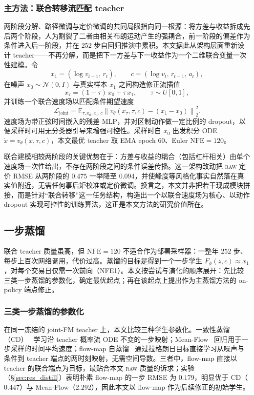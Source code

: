 \documentclass[11pt]{ctexart}
\newcommand{\raw}{\textsc{raw}}
\newcommand{\E}{\mathbb{E}}
\newcommand{\nfe}{\mathrm{NFE}}
\begin{document}
\subsubsection{主方法：联合转移流匹配 teacher}
\label{sec:jointfm}
两阶段分解、路径微调与定价微调的共同局限指向同一根源：将方差与收益拆成先后两个阶段，人为割裂了二者由相关布朗运动产生的强耦合，前一阶段的偏差作为条件进入后一阶段，并在 $252$ 步自回归推演中累积。本文据此从架构层面重新设计 teacher——不再分解，而是把下一方差与下一收益作为一个二维联合变量一次性建模。令
\[
x_1 = (\log v_{t+1},\, r_t), \qquad c=(\log v_t,\,r_{t-1},\,a_t),
\]
在噪声 $x_0\sim\mathcal N(0,I)$ 与真实样本 $x_1$ 之间构造修正流插值~\citep{lipman2023flow,liu2023rectified,albergo2023stochastic}
\[
x_\tau=(1-\tau)\,x_0+\tau\,x_1,\qquad \tau\sim U[0,1],
\]
并训练一个联合速度场以匹配条件期望速度
\begin{equation}
\mathcal L_{\mathrm{joint}}
=\E_{\tau,x_0,x_1,c}
\left\|v_\theta(x_\tau,\tau,c)-(x_1-x_0)\right\|_2^2 .
\end{equation}
速度场为带正弦时间嵌入的残差 MLP，并对区制动作做一定比例的 dropout，以便采样时可用无分类器引导来增强可控性。采样时自 $x_0$ 出发积分 ODE $\dot x=v_\theta(x,\tau,c)$，本文最优 teacher 取 EMA epoch 60、Euler $\nfe{=}120$。

联合建模相较两阶段的关键优势在于：方差与收益的耦合（包括杠杆相关）由单个速度场一次性给出，不存在两阶段之间的条件误差传播。这一架构改动把 \raw{} 定价 RMSE 从两阶段的 $0.475$ 一举降至 $0.094$，并使峰度等风格化事实自然落在真实值附近，无需任何事后矩校准或定价微调。换言之，本文并非把若干现成模块拼接，而是针对“联合转移”这一任务结构，构造出一个以联合速度场为核心、以动作 dropout 实现可控性的训练算法，这正是本文方法的研究价值所在。

\subsection{一步蒸馏}
\label{sec:distill}
联合 teacher 质量虽高，但 $\nfe{=}120$ 不适合作为部署采样器：一整年 $252$ 步、每步上百次网络调用，代价过高。蒸馏的目标是得到一个一步学生 $F_\phi(z,c)\approx x_1$，对每个交易日仅需一次前向（NFE1）。本文按尝试与演化的顺序展开：先比较三类一步蒸馏的参数化，确定最优起点；再在该起点上提出作为主蒸馏方法的 on-policy 端点修正。

\subsubsection{三类一步蒸馏的参数化}
\label{sec:distillfamily}
在同一冻结的 joint-FM teacher 上，本文比较三种学生参数化。一致性蒸馏（CD）~\citep{song2023consistency,song2024improved} 学习沿 teacher 概率流 ODE 不变的一步映射；Mean-Flow~\citep{geng2025meanflow} 回归用于一步采样的时间平均速度；flow-map 自蒸馏~\citep{boffi2025flowmaps} 通过拉格朗日目标直接学习从噪声与条件到 teacher 端点的两时刻映射，无需空间导数。三者中，flow-map 直接以 teacher 的联合端点为目标，最贴合本文 \raw{} 质量的诉求；实验（\S\ref{sec:res_distill}）表明朴素 flow-map 的一步 RMSE 为 $0.179$，明显优于 CD（$0.447$）与 Mean-Flow（$2.292$），因此本文以 flow-map 作为后续修正的初始学生。
\end{document}
